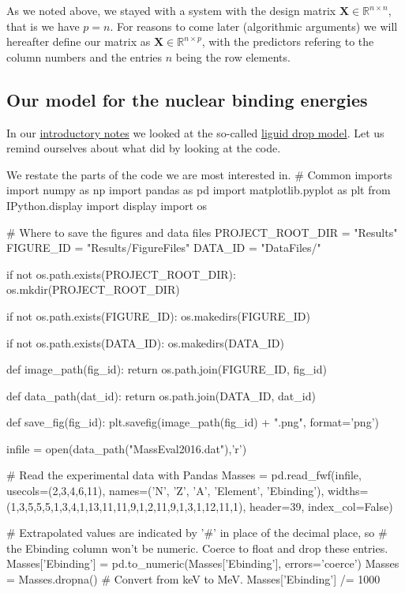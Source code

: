 \documentclass[%
oneside,                 %
final,                   %
10pt]{article}
\begin{document}
As we noted above, we stayed with a system with the design matrix 
 $\bm{X}\in {\mathbb{R}}^{n\times n}$, that is we have $p=n$. For reasons to come later (algorithmic arguments) we will hereafter define 
our matrix as $\bm{X}\in {\mathbb{R}}^{n\times p}$, with the predictors refering to the column numbers and the entries $n$ being the row elements.




\subsection{Our model for the nuclear binding energies}

In our \href{{https://compphysics.github.io/MachineLearningMSU/doc/pub/Introduction/html/Introduction.html}}{introductory notes} we looked at the so-called \href{{https://en.wikipedia.org/wiki/Semi-empirical_mass_formula}}{liguid drop model}. Let us remind ourselves about what did by looking at the code.

We restate the parts of the code we are most interested in.
\bpycod
# Common imports
import numpy as np
import pandas as pd
import matplotlib.pyplot as plt
from IPython.display import display
import os

# Where to save the figures and data files
PROJECT_ROOT_DIR = "Results"
FIGURE_ID = "Results/FigureFiles"
DATA_ID = "DataFiles/"

if not os.path.exists(PROJECT_ROOT_DIR):
    os.mkdir(PROJECT_ROOT_DIR)

if not os.path.exists(FIGURE_ID):
    os.makedirs(FIGURE_ID)

if not os.path.exists(DATA_ID):
    os.makedirs(DATA_ID)

def image_path(fig_id):
    return os.path.join(FIGURE_ID, fig_id)

def data_path(dat_id):
    return os.path.join(DATA_ID, dat_id)

def save_fig(fig_id):
    plt.savefig(image_path(fig_id) + ".png", format='png')

infile = open(data_path("MassEval2016.dat"),'r')


# Read the experimental data with Pandas
Masses = pd.read_fwf(infile, usecols=(2,3,4,6,11),
              names=('N', 'Z', 'A', 'Element', 'Ebinding'),
              widths=(1,3,5,5,5,1,3,4,1,13,11,11,9,1,2,11,9,1,3,1,12,11,1),
              header=39,
              index_col=False)

# Extrapolated values are indicated by '#' in place of the decimal place, so
# the Ebinding column won't be numeric. Coerce to float and drop these entries.
Masses['Ebinding'] = pd.to_numeric(Masses['Ebinding'], errors='coerce')
Masses = Masses.dropna()
# Convert from keV to MeV.
Masses['Ebinding'] /= 1000
\end{document}
